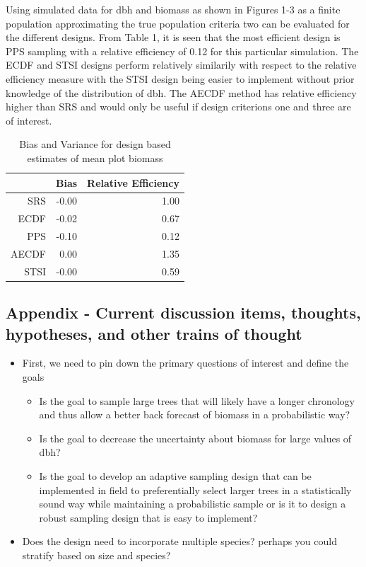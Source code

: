 \documentclass{beamer}
\begin{document}
%
\begin{frame}
  Using simulated data for dbh and biomass as shown in Figures 1-3 as a finite population approximating the true population criteria two can be evaluated for the different designs. From Table 1, it is seen that the most efficient design is PPS sampling with a relative efficiency of 0.12 for this particular simulation. The ECDF and STSI designs perform relatively similarily with respect to the relative efficiency measure with the STSI design being easier to implement without prior knowledge of the distribution of dbh. The AECDF method has relative efficiency higher than SRS and would only be useful if design criterions one and three are of interest.\\
\end{frame}
%
\begin{frame}
  \begin{table}
    \centering
    \caption{Bias and Variance for design based estimates of mean plot biomass}
    \begin{tabular}{rrr}
    \hline
    & Bias & Relative Efficiency \\ 
    \hline
    SRS & -0.00 & 1.00 \\ 
    ECDF & -0.02 & 0.67 \\ 
    PPS & -0.10 & 0.12 \\ 
    AECDF & 0.00 & 1.35 \\ 
    STSI & -0.00 & 0.59 \\ 
     \hline
  \end{tabular}
  \end{table}
\end{frame}
%
\begin{frame}
  \section{Appendix - Current discussion items, thoughts, hypotheses, and other trains of thought}
  \begin{itemize}
    \item First, we need to pin down the primary questions of interest and define the goals
    \begin{itemize}
      \item Is the goal to sample large trees that will likely have a longer chronology and thus allow a better back forecast of biomass in a probabilistic way?
      \item Is the goal to decrease the uncertainty about biomass for large values of dbh?
      \item Is the goal to develop an adaptive sampling design that can be implemented in field to preferentially select larger trees in a statistically sound way while maintaining a probabilistic sample or is it to design a robust sampling design that is easy to implement?
    \end{itemize}
    \item Does the design need to incorporate multiple species? perhaps you could stratify based on size and species?
  \end{itemize}
\end{frame}
%
\end{document}
